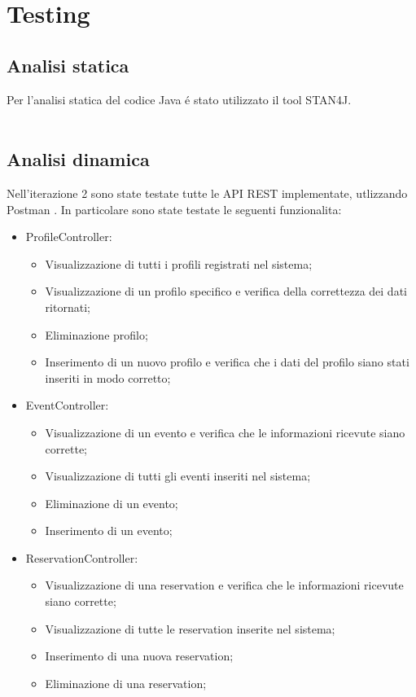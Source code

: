 \section{Testing}
\subsection{Analisi statica}
Per l’analisi statica del codice Java é stato utilizzato il tool STAN4J.
\\
\\


\subsection{Analisi dinamica}
Nell’iterazione 2 sono state testate tutte le API REST implementate, utlizzando Postman .
In particolare sono state testate le seguenti funzionalita:

\begin{itemize}
	\item ProfileController:
	\begin{itemize}
		\item Visualizzazione di tutti i profili registrati nel sistema;
		\item Visualizzazione di un profilo specifico e verifica della correttezza dei dati ritornati;
		\item Eliminazione profilo;
		\item Inserimento di un nuovo profilo e verifica che i dati del profilo siano stati inseriti in modo corretto;
	\end{itemize}
	\item EventController:
	\begin{itemize}
		\item Visualizzazione di un evento e verifica che le informazioni ricevute siano corrette;
		\item Visualizzazione di tutti gli eventi inseriti nel sistema;
		\item Eliminazione di un evento;
		\item Inserimento di un evento;
	\end{itemize}
	\item ReservationController:
	\begin{itemize}
		\item Visualizzazione di una reservation e verifica che le informazioni ricevute siano corrette;
		\item Visualizzazione di tutte le reservation inserite nel sistema;
		\item Inserimento di una nuova reservation;
		\item Eliminazione di una reservation;
	\end{itemize}

\end{itemize}

